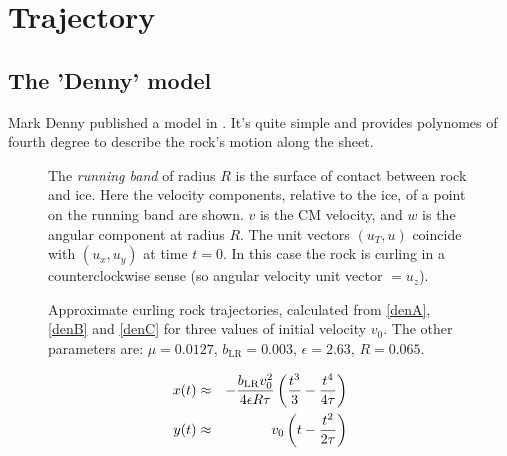 \chapter{Trajectory}

\section{The 'Denny' model}

Mark Denny published a model in \cite{denny:98}. It's quite simple and provides
polynomes of fourth degree to describe the rock's motion along the sheet.

\begin{figure}[htb]
\begin{center}

\end{center}
\caption[Denny setup]{The \emph{running band} of radius $R$ is the surface
    of contact between rock and ice. Here the velocity components, relative to
    the ice, of a point on the running band are shown. $v$ is the CM velocity,
    and $w$ is the angular component at radius $R$. The unit vectors $(u_T, u)$
    coincide with $(u_x,u_y)$ at time $t=0$. In this case the rock is curling
    in a counterclockwise sense (so angular velocity unit vector $=u_z$).
    }
\end{figure}

\iftrue
\begin{figure}[tb]
\begin{center}

\end{center}
\caption[Curling rock trajectories]{%
     Approximate curling rock trajectories, calculated from 
     \eqref{denA}, \eqref{denB} and \eqref{denC}
     for three values of initial velocity $v_0$. The other parameters are:
     $\mu           = 0.0127$,
     $b_\mathrm{LR} = 0.003$,
     $\epsilon      = 2.63$,
     $R             = 0.065$.}
\end{figure}
\fi

\begin{eqnarray}
\eqlab{denA} 
x(t) &\approx& - \frac{ b_\mathrm{LR} v_0^2 }{ 4 \epsilon R \tau }
    \left( \frac{ t^3 }{ 3 } - \frac{ t^4 } { 4 \tau } \right) \\
\eqlab{denB} 
y(t) &\approx& v_0 \left( t - \frac{ t^2 }{ 2\tau } \right)
\end{eqnarray}

